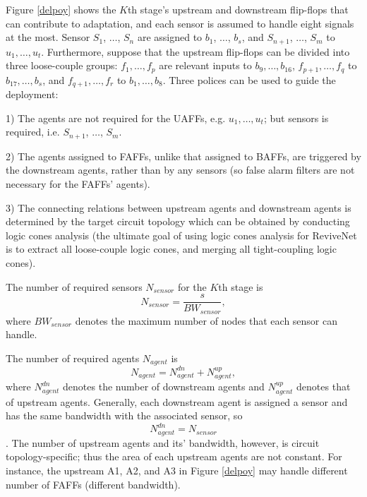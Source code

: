 Figure \ref{delpoy} shows the $K$th stage's upstream and downstream flip-flops that can contribute to adaptation, and each sensor is assumed to handle eight signals at the most. Sensor $S_1$, $\ldots$, $S_n$ are assigned to $b_1$, $\ldots$, $b_s$, and $S_{n+1}$, $\ldots$, $S_m$ to $u_1,\ldots, u_t$. Furthermore, suppose that the upstream flip-flops can be divided into three loose-couple groups: $f_1,\ldots, f_p$ are relevant inputs to $b_9, \ldots, b_{16}$, $f_{p+1},\ldots, f_q$ to $b_{17}, \ldots, b_s$, and $f_{q+1},\ldots, f_r$ to $b_1, \ldots, b_8$. Three polices can be used to guide the deployment:

1) The agents are not required for the UAFFs, e.g. $u_1, \ldots, u_t$; but sensors is required,
i.e. $S_{n+1}$, $\ldots$, $S_m$.

2) The agents assigned to FAFFs, unlike that assigned to BAFFs, are triggered by the downstream agents, rather than by any sensors (so false alarm filters are not necessary for the FAFFs' agents).

3) The connecting relations between upstream agents and downstream agents is determined by the target circuit topology which can be obtained by conducting logic cones analysis (the ultimate goal of using logic cones analysis for ReviveNet is to extract all loose-couple logic cones, and merging all tight-coupling logic cones).

The number of required sensors $N_{sensor}$ for the $K$th stage is
\begin{equation}\label{numsensor}
N_{sensor}=\frac{s}{BW_{sensor}},
\end{equation}
where $BW_{sensor}$ denotes the maximum number of nodes that each sensor can handle.

The number of required agents $N_{agent}$ is
\begin{equation}\label{numagent}
N_{agent}=N_{agent}^{dn}+N_{agent}^{up},
\end{equation}
where $N_{agent}^{dn}$ denotes the number of downstream agents and $N_{agent}^{up}$ denotes that of upstream agents. Generally, each downstream agent is assigned a sensor and has the same bandwidth with the associated sensor, so \begin{equation}N_{agent}^{dn}=N_{sensor}\end{equation}. The number of upstream agents and its' bandwidth, however, is circuit topology-specific; thus the area of each upstream agents are not constant. For instance, the upstream A1, A2, and A3 in Figure \ref{delpoy} may handle different number of FAFFs (different bandwidth).

